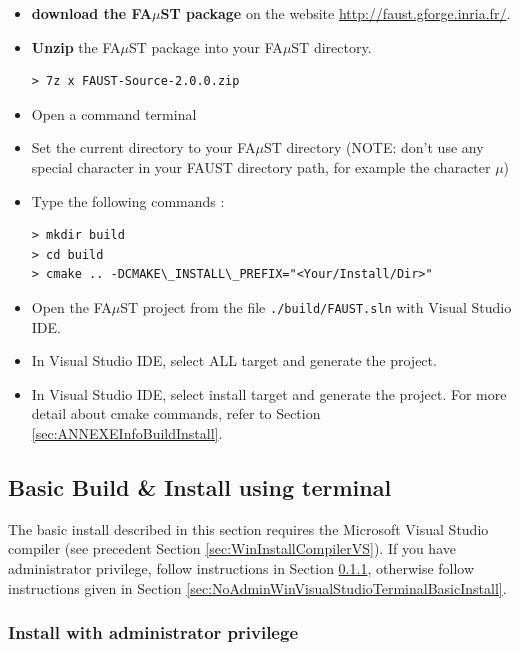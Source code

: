 \begin{itemize}
\item \textbf{download the FA$\mu$ST package} on the website  \url{http://faust.gforge.inria.fr/}. 
\item \textbf{Unzip} the FA$\mu$ST package into your FA$\mu$ST directory. 
\begin{lstlisting}
> 7z x FAUST-Source-2.0.0.zip
\end{lstlisting}
\item Open a command terminal
\item Set the current directory to your FA$\mu$ST directory (NOTE: don't use any special character in your FAUST directory path, for example the character $\mu$)
\item Type the following commands : 
\begin{lstlisting}
> mkdir build
> cd build
> cmake .. -DCMAKE\_INSTALL\_PREFIX="<Your/Install/Dir>"
\end{lstlisting}
\item Open the FA$\mu$ST project from the file \texttt{./build/FAUST.sln} with Visual Studio IDE.
\item In Visual Studio IDE, select ALL target and generate the project.
\item In Visual Studio IDE, select install target and generate the project.
For more detail about cmake commands, refer to Section \ref{sec:ANNEXEInfoBuildInstall}.

\end{itemize}

\subsection{Basic Build \& Install using terminal}\label{sec:WinVisualStudioTerminalBasicInstall}
The basic install described in this section requires the Microsoft Visual Studio compiler (see precedent Section \ref{sec:WinInstallCompilerVS}).
If you have administrator privilege, follow instructions in Section \ref{sec:AdminWinVisualStudioTerminalBasicInstall}, otherwise follow instructions given in Section \ref{sec:NoAdminWinVisualStudioTerminalBasicInstall}.

\subsubsection{Install with administrator privilege}
\label{sec:AdminWinVisualStudioTerminalBasicInstall}

